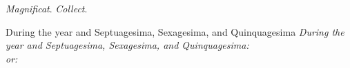 \documentclass[letterpaper,12pt]{article} %
\newcommand{\benedicamusdominointro}{During the year and Septuagesima, Sexagesima, and Quinquagesima}
\begin{document}
\emph{Magnificat}. \emph{Collect}.
\bigskip

\ifx\benedicamusdominogrefactor\undefined\else\setgrefactor{\benedicamusdominogrefactor}\fi
\ifx\benedicamusdominotex\undefined\else
\def\annot{\small{\benedicamusdominotone}}
\gresetfirstlineaboveinitial{\annot}{\annot}
\setsecondannotation{}
\setspaceafterinitial{0mm}
\setspacebeforeinitial{0mm}
\ifx\benedicamusdominointro\undefined\else
\hspace{3ex}\emph{\benedicamusdominointro:}\\
\fi
{}
\ifx\benedicamusdominotexalt\undefined\else
{%
\vspace{0pt plus 12pt}
\ifx\benedicamusdominoaltintro\undefined
\def\benedicamusdominoaltintro{or}\fi
\hspace{3ex}\emph{\benedicamusdominoaltintro:}\\
\def\annot{\small{\benedicamusdominotonealt}}
\gresetfirstlineaboveinitial{\annot}{\annot}
\setsecondannotation{}
\setspaceafterinitial{0mm}
\setspacebeforeinitial{0mm}
\greblockcustos%
}
\fi
\fi
\end{document}
